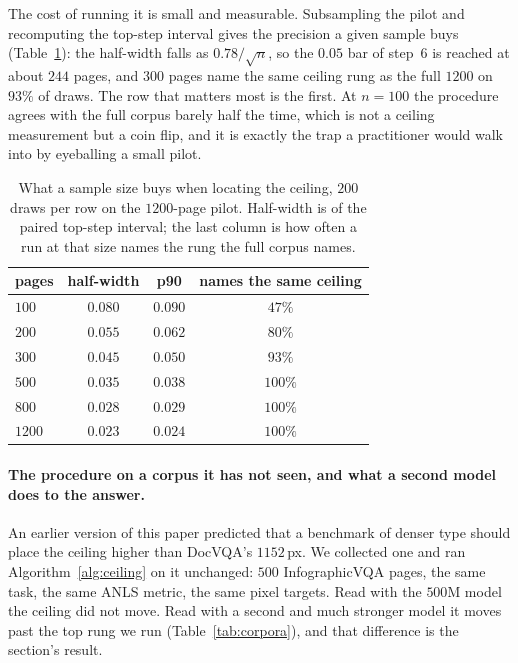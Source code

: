 \documentclass[10pt,twocolumn]{article}
\theoremstyle{plain}
\begin{document}
The cost of running it is small and measurable. Subsampling the pilot and
recomputing the top-step interval gives the precision a given sample buys
(Table~\ref{tab:samplesize}): the half-width falls as $0.78/\sqrt{n}$, so the
$0.05$ bar of step~6 is reached at about $244$ pages, and $300$ pages name the
same ceiling rung as the full $1200$ on $93\%$ of draws. The row that matters
most is the first. At $n=100$ the procedure agrees with the full corpus barely
half the time, which is not a ceiling measurement but a coin flip, and it is
exactly the trap a practitioner would walk into by eyeballing a small pilot.

\begin{table}[t]
\centering\small
\setlength{\tabcolsep}{5pt}
\begin{tabular}{lccc}
\toprule
pages & half-width & p90 & names the same ceiling \\
\midrule
$100$  & $0.080$ & $0.090$ & $47\%$ \\
$200$  & $0.055$ & $0.062$ & $80\%$ \\
$300$  & $0.045$ & $0.050$ & $93\%$ \\
$500$  & $0.035$ & $0.038$ & $100\%$ \\
$800$  & $0.028$ & $0.029$ & $100\%$ \\
$1200$ & $0.023$ & $0.024$ & $100\%$ \\
\bottomrule
\end{tabular}
\caption{What a sample size buys when locating the ceiling, $200$ draws per
row on the $1200$-page pilot. Half-width is of the paired top-step interval;
the last column is how often a run at that size names the rung the full corpus
names.}
\label{tab:samplesize}
\end{table}


\paragraph{The procedure on a corpus it has not seen, and what a second model
does to the answer.} An earlier version of this paper predicted that a
benchmark of denser type should place the ceiling higher than DocVQA's
$1152$\,px. We collected one and ran Algorithm~\ref{alg:ceiling} on it unchanged: $500$
InfographicVQA pages, the same task, the same ANLS metric, the same pixel
targets. Read with the $500$M model the ceiling did not move. Read with a
second and much stronger model it moves past the top rung we run
(Table~\ref{tab:corpora}), and that difference is the section's result.
\end{document}
